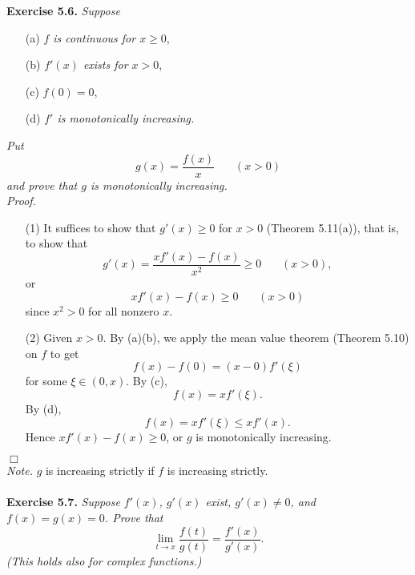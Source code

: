 \documentclass{article}
\begin{document}



\textbf{Exercise 5.6.}
\emph{Suppose}
\begin{enumerate}
  \item[(a)]
  \emph{$f$ is continuous for $x \geq 0$},

  \item[(b)]
  \emph{$f'(x)$ exists for $x > 0$},

  \item[(c)]
  \emph{$f(0) = 0$},

  \item[(d)]
  \emph{$f'$ is monotonically increasing.}
\end{enumerate}
\emph{Put
\[
  g(x) = \frac{f(x)}{x} \:\:\:\:\:\:\:\: (x>0)
\]
and prove that $g$ is monotonically increasing.} \\

\emph{Proof.}
\begin{enumerate}
  \item[(1)]
  It suffices to show that $g'(x) \geq 0$ for $x>0$ (Theorem 5.11(a)),
  that is, to show that
  \[
    g'(x) = \frac{x f'(x) - f(x)}{x^2} \geq 0 \:\:\:\:\:\:\:\: (x>0),
  \]
  or
  \[
    x f'(x) - f(x) \geq 0 \:\:\:\:\:\:\:\: (x>0)
  \]
  since $x^2 > 0$ for all nonzero $x$.

  \item[(2)]
  Given $x > 0$.
  By (a)(b), we apply the mean value theorem (Theorem 5.10) on $f$ to get
  \[
    f(x) - f(0) = (x - 0)f'(\xi)
  \]
  for some $\xi \in (0,x)$.
  By (c),
  \[
    f(x) = x f'(\xi).
  \]
  By (d),
  \[
    f(x) = x f'(\xi) \leq x f'(x).
  \]
  Hence $x f'(x) - f(x) \geq 0$,
  or $g$ is monotonically increasing.
\end{enumerate}
$\Box$ \\

\emph{Note.}
$g$ is increasing strictly if $f$ is increasing strictly. \\\\






\textbf{Exercise 5.7.}
\emph{Suppose $f'(x)$, $g'(x)$ exist, $g'(x) \neq 0$, and $f(x) = g(x) = 0$.
Prove that
\[
  \lim_{t \to x}{\frac{f(t)}{g(t)}} = \frac{f'(x)}{g'(x)}.
\]
(This holds also for complex functions.)} \\
\end{document}
